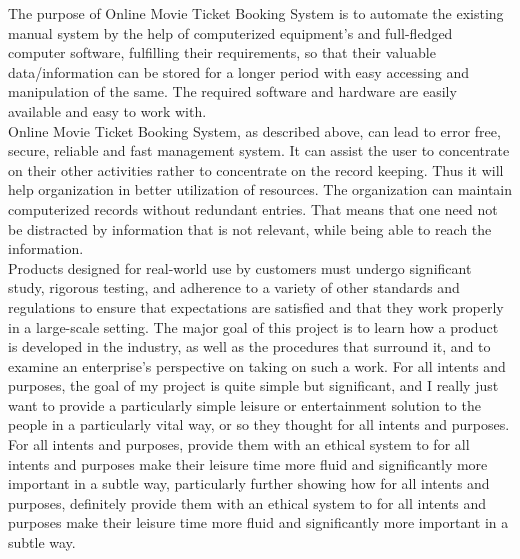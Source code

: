 \documentclass[oneside,a4paper,12pt]{report}
\begin{document}
	


\thispagestyle{plain}
\setcounter{page}{0}
\frontmatter
\rfoot{\thepage}





		
{   }
     The purpose of Online Movie Ticket Booking System is to automate the existing manual system by the help of computerized equipment’s and full-fledged computer software, fulfilling their requirements, so that their valuable data/information can be stored for a longer period with easy accessing and manipulation of the same. The required software and hardware are easily available and easy to work with.\\
    Online Movie Ticket Booking System, as described above, can lead to error free, secure, reliable and fast management system. It can assist the user to concentrate on their other activities rather to concentrate on the record keeping. Thus it will help organization in better utilization of resources. The organization can maintain computerized records without redundant entries. That means that one need not be distracted by information that is not relevant, while being able to reach the information.\\
Products designed for real-world use by customers must undergo significant study, rigorous testing, and adherence to a variety of other standards and regulations to ensure that expectations are satisfied and that they work properly in a large-scale setting. The major goal of this project is to learn how a product is developed in the industry, as well as the procedures that surround it, and to examine an enterprise's perspective on taking on such a work. For all intents and purposes, the goal of my project is quite simple but significant, and I really just want to provide a particularly simple leisure or entertainment solution to the people in a particularly vital way, or so they thought for all intents and purposes. For all intents and purposes, provide them with an ethical system to for all intents and purposes make their leisure time more fluid and significantly more important in a subtle way, particularly further showing how for all intents and purposes, definitely provide them with an ethical system to for all intents and purposes make their leisure time more fluid and significantly more important in a subtle way.\\
\end{document}
